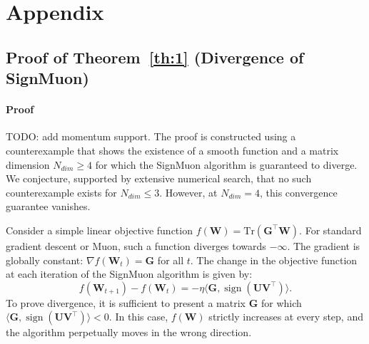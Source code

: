 \documentclass[letterpaper]{article} %
\begin{document}

% 


\appendix 
\section{Appendix}\label{app}
\subsection{Proof of Theorem~\ref{th:1} (Divergence of SignMuon)}\label{app:proof_th1}

\paragraph{Proof} TODO: add momentum support. The proof is constructed using a counterexample that shows the existence of a smooth function and a matrix dimension $N_{dim} \ge 4$ for which the SignMuon algorithm is guaranteed to diverge. We conjecture, supported by extensive numerical search, that no such counterexample exists for $N_{dim}\le3$. However, at $N_{dim} = 4$, this convergence guarantee vanishes.

Consider a simple linear objective function $f(\mathbf{W}) = \mathrm{Tr}(\mathbf{G}^\top \mathbf{W})$. For standard gradient descent or Muon, such a function diverges towards $-\infty$. The gradient is globally constant: $\nabla f(\mathbf{W}_t) = \mathbf{G}$ for all $t$. The change in the objective function at each iteration of the SignMuon algorithm is given by:
\begin{equation}
f(\mathbf{W}_{t+1}) - f(\mathbf{W}_t) = -\eta \langle \mathbf{G}, \operatorname{sign}(\mathbf{U} \mathbf{V}^\top) \rangle.
\end{equation} 
To prove divergence, it is sufficient to present a matrix $\mathbf{G}$ for which $\langle \mathbf{G}, \operatorname{sign}(\mathbf{U} \mathbf{V}^\top) \rangle < 0$. In this case, $f(\mathbf{W})$ strictly increases at every step, and the algorithm perpetually moves in the wrong direction.
\end{document}
